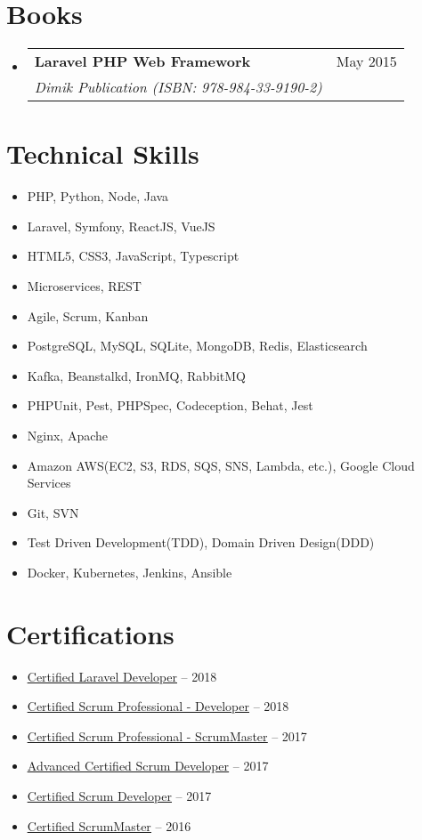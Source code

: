 \documentclass[a4paper,11pt]{article}
\makeatletter
\newcommand{\resumeItem}[1]{
  \item\small{
    {#1 \vspace{-2pt}}
  }
}
\newcommand{\resumeSubheading}[4]{
  \vspace{-2pt}\item
    \begin{tabular*}{0.97\textwidth}[t]{l@{\extracolsep{\fill}}r}
      \textbf{\large{#1}} \small{\textit{#4}} & #2 \\
      \textsl{#3}
    \end{tabular*}\vspace{-7pt}
}
\newcommand{\resumeSubHeadingListStart}{\begin{itemize}[leftmargin=0.15in, label={}]}
\newcommand{\resumeSubHeadingListEnd}{\end{itemize}}
\newcommand{\resumeItemListStart}{\begin{itemize}}
\newcommand{\resumeItemListEnd}{\end{itemize}\vspace{-5pt}}
\makeatother
\begin{document}
\section{Books}
  \resumeSubHeadingListStart    
    \resumeSubheading
      {\textbf{Laravel PHP Web Framework}}{May 2015}
      {Dimik Publication (ISBN: 978-984-33-9190-2)} {}
  \resumeSubHeadingListEnd


\section{Technical Skills}
 \begin{itemize}[leftmargin=0.15in, label={}]    
    \resumeItemListStart
      \resumeItem{PHP, Python, Node, Java}
      \resumeItem{Laravel, Symfony, ReactJS, VueJS}
      \resumeItem{HTML5, CSS3, JavaScript, Typescript}
      \resumeItem{Microservices, REST}
      \resumeItem{Agile, Scrum, Kanban}
      \resumeItem{PostgreSQL, MySQL, SQLite, MongoDB, Redis, Elasticsearch}
      \resumeItem{Kafka, Beanstalkd, IronMQ, RabbitMQ}
      \resumeItem{PHPUnit, Pest, PHPSpec, Codeception, Behat, Jest}
      \resumeItem{Nginx, Apache}
      \resumeItem{Amazon AWS(EC2, S3, RDS, SQS, SNS, Lambda, etc.), Google Cloud Services}
      \resumeItem{Git, SVN}
      \resumeItem{Test Driven Development(TDD), Domain Driven Design(DDD)}
      \resumeItem{Docker, Kubernetes, Jenkins, Ansible}
    \resumeItemListEnd
 \end{itemize}
 

\section{Certifications}
  \begin{itemize}[leftmargin=0.15in, label={}]
      \resumeItemListStart
        \resumeItem{\href{https://exam.laravelcert.com/is/nuruzzaman-milon/certified-since/2018-01-08}{\underline{Certified Laravel Developer}} -- 2018}
        \resumeItem{\href{https://bcert.me/swoqnnlks}{\underline{Certified Scrum Professional - Developer}} -- 2018}
        \resumeItem{\href{https://bcert.me/swajseym}{\underline{Certified Scrum Professional - ScrumMaster}} -- 2017}
        \resumeItem{\href{https://bcert.me/segniwpnm}{\underline{Advanced Certified Scrum Developer}} -- 2017}
        \resumeItem{\href{https://bcert.me/skctlvko}{\underline{Certified Scrum Developer}} -- 2017}
        \resumeItem{\href{https://bcert.me/snynrkpl}{\underline{Certified ScrumMaster}} -- 2016}
      \resumeItemListEnd
  \end{itemize}
\end{document}
